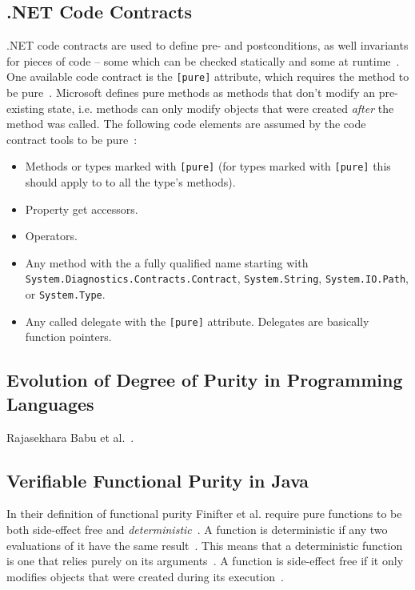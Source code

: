 \documentclass[a4paper,12pt]{article}
\begin{document}
\subsection{.NET Code Contracts} \label{sub:Code contracts} %
.NET code contracts are used to define pre- and postconditions, as well invariants for pieces of code -- some which can be checked statically and some at runtime~\cite{microsoft-code-contracts}. One available code contract is the \texttt{[pure]} attribute, which requires the method to be pure~\cite{microsoft-code-contracts}. Microsoft defines pure methods as methods that don't modify an pre-existing state, i.e. methods can only modify objects that were created \textit{after} the method was called. The following code elements are assumed by the code contract tools to be pure~\cite{microsoft-code-contracts}:

\begin{itemize}
  \item Methods or types marked with \texttt{[pure]} (for types marked with \texttt{[pure]} this should apply to to all the type's methods).
  \item Property get accessors.
  \item Operators.
  \item Any method with the a fully qualified name starting with \texttt{System.Diagnost\-ics.Contracts.Contract}, \texttt{System.String}, \texttt{System\-.IO.Path}, or \texttt{System.Type}.
  \item Any called delegate with the \texttt{[pure]} attribute. Delegates are basically function pointers.
\end{itemize}

\subsection{Evolution of Degree of Purity in Programming Languages} \label{sub:Evolution of Degree of Purity in Programming Languages}
Rajasekhara Babu et al.~\cite{rajasekharababu2012evolution}.

\subsection{Verifiable Functional Purity in Java} \label{sub:Verifiable-Functional-Purity-in-Java}
In their definition of functional purity Finifter et al. require pure functions to be both side-effect free and \textit{deterministic}~\cite{purity-in-java}. A function is deterministic if any two evaluations of it have the same result~\cite{purity-in-java}. This means that a deterministic function is one that relies purely on its arguments~\cite{purity-in-java}. A function is side-effect free if it only modifies objects that were created during its execution~\cite{purity-in-java}.
\end{document}
